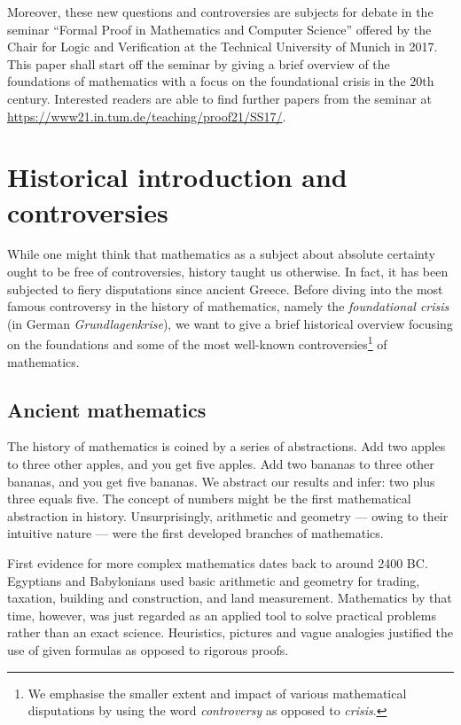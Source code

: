 \documentclass[hidelinks]{article}
\begin{document}
Moreover, these new questions and controversies are subjects for debate in the seminar ``Formal Proof in Mathematics and Computer Science'' offered by the Chair for Logic and Verification at the Technical University of Munich in 2017. This paper shall start off the seminar by giving a brief overview of the foundations of mathematics with a focus on the foundational crisis in the 20th century. Interested readers are able to find further papers from the seminar at \url{https://www21.in.tum.de/teaching/proof21/SS17/}.
\newpage

\tableofcontents 
\newpage

\section{Historical introduction and controversies}
While one might think that mathematics as a subject about absolute certainty ought to be free of controversies, history taught us otherwise. In fact, it has been subjected to fiery disputations since ancient Greece. Before diving into the most famous controversy in the history of mathematics, namely the \textit{foundational crisis} (in German \textit{Grundlagenkrise}), we want to give a brief historical overview focusing on the foundations and some of the most well-known controversies\footnote{We emphasise the smaller extent and impact of various mathematical disputations by using the word \textit{controversy} as opposed to \textit{crisis}.} of mathematics.

\subsection{Ancient mathematics}

The history of mathematics is coined by a series of abstractions.
Add two apples to three other apples, and you get five apples. Add two bananas to three other bananas, and you get five bananas. We abstract our results and infer: two plus three equals five. The concept of numbers might be the first mathematical abstraction in history. Unsurprisingly, arithmetic and geometry --- owing to their intuitive nature --- were the first developed branches of mathematics.

First evidence for more complex mathematics dates back to around 2400 BC\@. Egyptians and Babylonians used basic arithmetic and geometry for trading, taxation, building and construction, and land measurement. Mathematics by that time, however, was just regarded as an applied tool to solve practical problems rather than an exact science. Heuristics, pictures and vague analogies justified the use of given formulas as opposed to rigorous proofs.
\end{document}
